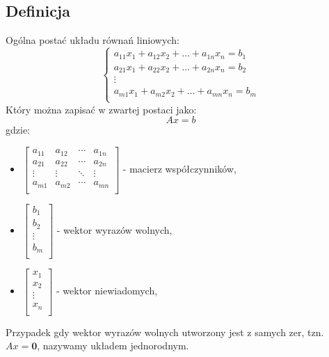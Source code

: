 \documentclass{article}
\begin{document}
\subsection{Definicja}
Ogólna postać układu równań liniowych:
$$
    \left\{
    \begin{array}{l}
        a_{11}x_{1} + a_{12}x_{2} + \dots + a_{1n}x_{n} = b_{1}\\
        a_{21}x_{1} + a_{22}x_{2} + \dots + a_{2n}x_{n} = b_{2}\\
        \vdots\\
        a_{m1}x_{1} + a_{m2}x_{2} + \dots + a_{mn}x_{n} = b_{m}\\
    \end{array}
    \right.
$$
Który można zapisać w zwartej postaci jako:
$$
    Ax = b
$$
gdzie:
\begin{itemize}
    \item 
    $
        \left[
        \begin{array}{cccc}
            a_{11}  &   a_{12}  &   \cdots  &   a_{1n}\\
            a_{21}  &   a_{22}  &   \cdots  &   a_{2n}\\
            \vdots  &   \vdots  &   \ddots  &   \vdots\\
            a_{m1}  &   a_{m2}  &   \cdots  &   a_{mn}\\
        \end{array}
        \right]
    $ - macierz współczynników,
    \item
    $
    \left[
        \begin{array}{c}
            b_{1}\\
            b_{2}\\
            \vdots\\
            b_{m}\\
        \end{array}
        \right]
    $ - wektor wyrazów wolnych,
    \item
    $
        \left[
        \begin{array}{c}
            x_{1}\\
            x_{2}\\
            \vdots\\
            x_{n}\\
        \end{array}
        \right]
    $ - wektor niewiadomych,
\end{itemize}

Przypadek gdy wektor wyrazów wolnych utworzony jest z samych zer,
tzn. $Ax = \mathbf{0}$, nazywamy układem jednorodnym.
\end{document}
